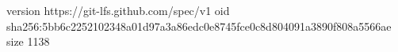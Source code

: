 version https://git-lfs.github.com/spec/v1
oid sha256:5bb6c2252102348a01d97a3a86edc0e8745fce0c8d804091a3890f808a5566ae
size 1138

